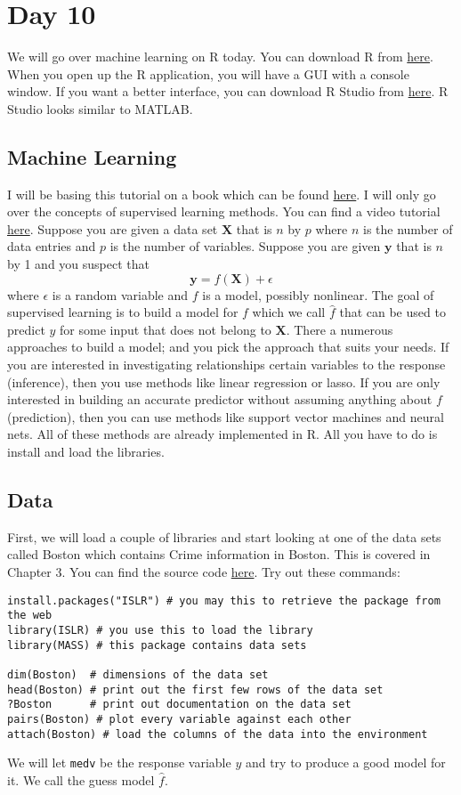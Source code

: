 \documentclass{article}
\begin{document}
\section{Day 10}
We will go over machine learning on R today. You can download R from \href{https://www.r-project.org/}{here}. When you open up the R application, you will have a GUI with a console window. If you want a better interface, you can download R Studio from \href{https://www.rstudio.com/products/rstudio/download/#download}{here}. R Studio looks similar to MATLAB.

\subsection{Machine Learning}
I will be basing this tutorial on a book which can be found \href{https://www-bcf.usc.edu/~gareth/ISL/}{here}. I will only go over the concepts of supervised learning methods. You can find a video tutorial \href{http://tagteam.harvard.edu/hub_feeds/1981/feed_items/1844177}{here}. Suppose you are given a data set $\textbf{X}$ that is $n$ by $p$ where $n$ is the number of data entries and $p$ is the number of variables. Suppose you are given $\textbf{y}$ that is $n$ by 1 and you suspect that $$\textbf{y}=f(\textbf{X})+\epsilon$$ where $\epsilon$ is a random variable and $f$ is a model, possibly nonlinear. The goal of supervised learning is to build a model for $f$ which we call $\hat{f}$ that can be used to predict $y$ for some input that does not belong to $\textbf{X}$. There a numerous approaches to build a model; and you pick the approach that suits your needs. If you are interested in investigating relationships certain variables to the response (inference), then you use methods like linear regression or lasso. If you are only interested in building an accurate predictor without assuming anything about $f$ (prediction), then you can use methods like support vector machines and neural nets. All of these methods are already implemented in R. All you have to do is install and load the libraries.

\subsection{Data}
First, we will load a couple of libraries and start looking at one of the data sets called Boston which contains Crime information in Boston. This is covered in Chapter 3. You can find the source code \href{http://www-bcf.usc.edu/~gareth/ISL/Chapter%203%20Lab.txt}{here}. Try out these commands:
\begin{verbatim}
install.packages("ISLR") # you may this to retrieve the package from the web
library(ISLR) # you use this to load the library
library(MASS) # this package contains data sets

dim(Boston)  # dimensions of the data set
head(Boston) # print out the first few rows of the data set
?Boston      # print out documentation on the data set
pairs(Boston) # plot every variable against each other
attach(Boston) # load the columns of the data into the environment
\end{verbatim}
We will let \texttt{medv} be the response variable $y$ and try to produce a good model for it. We call the guess model $\hat{f}$.
\end{document}
